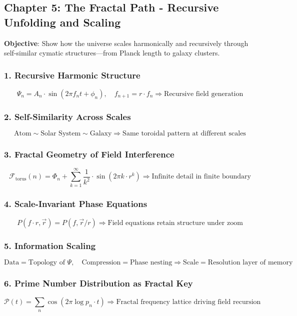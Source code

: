 \subsection{Chapter 5: The Fractal Path - Recursive Unfolding and Scaling}
\textbf{Objective}: Show how the universe scales harmonically and recursively through self-similar cymatic structures—from Planck length to galaxy clusters.

\subsubsection*{1. Recursive Harmonic Structure}
\[
\Psi_n = A_n \cdot \sin \left( 2 \pi f_n t + \phi_n \right), \quad f_{n+1} = r \cdot f_n \Rightarrow \text{Recursive field generation}
\]

\subsubsection*{2. Self-Similarity Across Scales}
\[
\text{Atom} \sim \text{Solar System} \sim \text{Galaxy} \Rightarrow \text{Same toroidal pattern at different scales}
\]

\subsubsection*{3. Fractal Geometry of Field Interference}
\[
\mathcal{F}_{\text{torus}}(n) = \Phi_n + \sum_{k=1}^{\infty} \frac{1}{k^2} \cdot \sin \left( 2 \pi k \cdot r^k \right) \Rightarrow \text{Infinite detail in finite boundary}
\]

\subsubsection*{4. Scale-Invariant Phase Equations}
\[
P(f \cdot r, \vec{r}) = P(f, \vec{r} / r) \Rightarrow \text{Field equations retain structure under zoom}
\]

\subsubsection*{5. Information Scaling}
\[
\text{Data} = \text{Topology of } \Psi, \quad \text{Compression} = \text{Phase nesting} \Rightarrow \text{Scale} = \text{Resolution layer of memory}
\]

\subsubsection*{6. Prime Number Distribution as Fractal Key}
\[
\mathcal{P}(t) = \sum_n \cos \left( 2 \pi \log p_n \cdot t \right) \Rightarrow \text{Fractal frequency lattice driving field recursion}
\]

